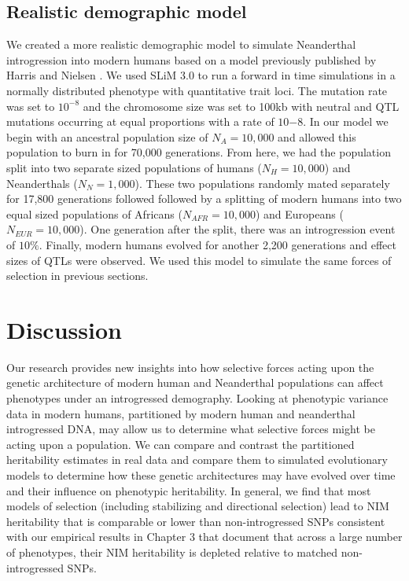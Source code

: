 \subsection{Realistic demographic model}
We created a more realistic demographic model to simulate Neanderthal introgression into modern humans based on a model previously published by Harris and Nielsen \cite{harris2016genetic}. We used SLiM 3.0 \cite{haller2019slim} to run a forward in time simulations in a normally distributed phenotype with quantitative trait loci. The mutation rate was set to $10^{-8}$ and the chromosome size was set to 100kb with neutral and QTL mutations occurring at equal proportions with a rate of $10{-8}$. In our model we begin with an ancestral population size of $N_A = 10,000$ and allowed this population to burn in for 70,000 generations. From here, we had the population split into two separate sized populations of humans ($N_H = 10,000$) and Neanderthals ($N_N = 1,000$). These two populations randomly mated separately for 17,800 generations followed followed by a splitting of modern humans into two equal sized populations of Africans ($N_{AFR} = 10,000$) and Europeans ($N_{EUR} = 10,000$). One generation after the split, there was an introgression event of $10\%$. Finally, modern humans evolved for another 2,200 generations and effect sizes of QTLs were observed. We used this model to simulate the same forces of selection in previous sections. 
\section{Discussion}
Our research provides new insights into how selective forces acting upon the genetic architecture of modern human and Neanderthal populations can affect phenotypes under an introgressed demography. Looking at phenotypic variance data in modern humans, partitioned by modern human and neanderthal introgressed DNA, may allow us to determine what selective forces might be acting upon a population. We can compare and contrast  the partitioned heritability estimates in real data and compare them to simulated evolutionary models to determine how these genetic architectures may have evolved over time and their influence on phenotypic heritability. In general, we find that most models of selection (including stabilizing and directional selection) lead to NIM heritability that is comparable or lower than non-introgressed SNPs consistent with our empirical results in Chapter 3 that document that across a large number of phenotypes, their NIM heritability is depleted relative to matched non-introgressed SNPs.
\newpage
